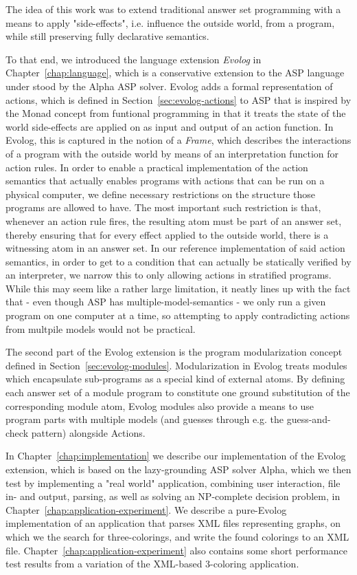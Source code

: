 The idea of this work was to extend traditional answer set programming with a means to apply "side-effects", i.e. influence the outside world, from a program, while still preserving fully declarative semantics. 

To that end, we introduced the language extension \emph{Evolog} in Chapter~\ref{chap:language}, which is a conservative extension to the ASP language under stood by the Alpha ASP solver. Evolog adds a formal representation of actions, which is defined in Section~\ref{sec:evolog-actions} to ASP that is inspired by the Monad concept from funtional programming in that it treats the state of the world side-effects are applied on as input and output of an action function. In Evolog, this is captured in the notion of a \emph{Frame}, which describes the interactions of a program with the outside world by means of an interpretation function for action rules. In order to enable a practical implementation of the action semantics that actually enables programs with actions that can be run on a physical computer, we define necessary restrictions on the structure those programs are allowed to have. The most important such restriction is that, whenever an action rule fires, the resulting atom must be part of an answer set, thereby ensuring that for every effect applied to the outside world, there is a witnessing atom in an answer set. In our reference implementation of said action semantics, in order to get to a condition that can actually be statically verified by an interpreter, we narrow this to only allowing actions in stratified programs. While this may seem like a rather large limitation, it neatly lines up with the fact that - even though ASP has multiple-model-semantics - we only run a given program on one computer at a time, so attempting to apply contradicting actions from multpile models would not be practical.

The second part of the Evolog extension is the program modularization concept defined in Section~\ref{sec:evolog-modules}. Modularization in Evolog treats modules which encapsulate sub-programs as a special kind of external atoms. By defining each answer set of a module program to constitute one ground substitution of the corresponding module atom, Evolog modules also provide a means to use program parts with multiple models (and guesses through e.g. the guess-and-check pattern) alongside Actions.

In Chapter~\ref{chap:implementation} we describe our implementation of the Evolog extension, which is based on the lazy-grounding ASP solver Alpha, which we then test by implementing a "real world" application, combining user interaction, file in- and output, parsing, as well as solving an NP-complete decision problem, in Chapter~\ref{chap:application-experiment}. We describe a pure-Evolog implementation of an application that parses XML files representing graphs, on which we the search for three-colorings, and write the found colorings to an XML file. Chapter~\ref{chap:application-experiment} also contains some short performance test results from a variation of the XML-based 3-coloring application.

